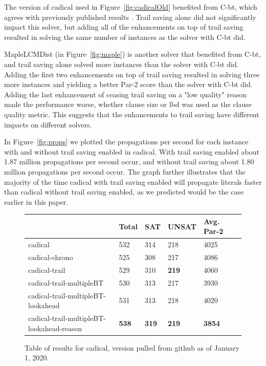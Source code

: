 \documentclass[runningheads]{llncs}
\newcommand{\cbt}{C-bt\xspace}
\begin{document}
The version of cadical used in Figure~\ref{fig:cadicalOld} benefited from \cbt, which agrees with previously published results \cite{DBLP:conf/sat/MohleB19}. Trail saving alone did not significantly impact this solver, but adding all of the enhancements on top of trail saving resulted in solving the same number of instances as the solver with \cbt did.

MapleLCMDist (in Figure~\ref{fig:maple}) is another solver that benefited from \cbt, and trail saving alone solved more instances than the solver with \cbt did. Adding the first two enhancements on top of trail saving resulted in solving three more instances and yielding a better Par-2 score than the solver with \cbt did. Adding the last enhancement of ceasing trail saving on a "low quality" reason made the performance worse, whether clause size or lbd was used as the clause quality metric. This suggests that the enhancements to trail saving have different impacts on different solvers.

In Figure~\ref{fig:props} we plotted the propagations per second for each instance with and without trail saving enabled in cadical. With trail saving enabled about 1.87 million propagations per second occur, and without trail saving about 1.80 million propagations per second occur. The graph further illustrates that the majority of the time cadical with trail saving enabled will propagate literals faster than cadical without trail saving enabled, as we predicted would be the case earlier in this paper.

\begin{figure}
\centering
    \begin{tabular}{|l|l|l|l|l|l|}
      \hline
      & Total & SAT & UNSAT & Avg. Par-2 \\ \hline
      cadical                  & 532          & 314 &  218  & 4025                             \\ \hline
      cadical-chrono          & 525          & 308 &  217  & 4086                             \\ \hline
      cadical-trail           & 529          & 310 &  \textbf{219}  & 4060                   \\ \hline
      cadical-trail-multipleBT & 530 & 313 & 217 & 3930 \\ \hline
      cadical-trail-multipleBT-lookahead & 531          & 313 &  218  & 4020                      \\ \hline
      cadical-trail-multipleBT-lookahead-reason & \textbf{538} & \textbf{319} & \textbf{219} & \textbf{3854} \\ \hline
    \end{tabular}
    \caption{Table of results for cadical, version pulled from github as of January 1, 2020.}
    \label{fig:cadicalNew}
\end{figure}
\end{document}
